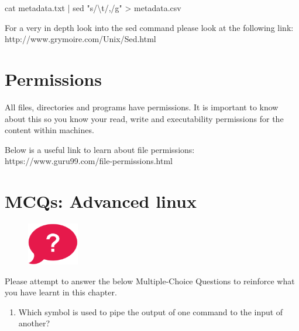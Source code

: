\documentclass[
  letterpaper,
  DIV=11,
  numbers=noendperiod]{scrreprt}
\newenvironment{Shaded}{\begin{snugshade}}{\end{snugshade}}
\newcommand{\FunctionTok}[1]{\textcolor[rgb]{0.28,0.35,0.67}{#1}}
\newcommand{\KeywordTok}[1]{\textcolor[rgb]{0.00,0.23,0.31}{#1}}
\newcommand{\NormalTok}[1]{\textcolor[rgb]{0.00,0.23,0.31}{#1}}
\newcommand{\OperatorTok}[1]{\textcolor[rgb]{0.37,0.37,0.37}{#1}}
\newcommand{\StringTok}[1]{\textcolor[rgb]{0.13,0.47,0.30}{#1}}
\providecommand{\tightlist}{%
  \setlength{\itemsep}{0pt}\setlength{\parskip}{0pt}}\usepackage{longtable,booktabs,array}
\begin{document}
\begin{Shaded}
\begin{Highlighting}[]
\FunctionTok{cat}\NormalTok{ metadata.txt }\KeywordTok{|} \FunctionTok{sed} \StringTok{"s/\textbackslash{}t/,/g"} \OperatorTok{\textgreater{}}\NormalTok{ metadata.csv}
\end{Highlighting}
\end{Shaded}

For a very in depth look into the sed command please look at the
following link: http://www.grymoire.com/Unix/Sed.html

\hypertarget{permissions}{%
\section{Permissions}\label{permissions}}

All files, directories and programs have permissions. It is important to
know about this so you know your read, write and executability
permissions for the content within machines.

Below is a useful link to learn about file permissions:\\
https://www.guru99.com/file-permissions.html

\hypertarget{mcqs-advanced-linux}{%
\section{MCQs: Advanced linux}\label{mcqs-advanced-linux}}

\begin{figure}

{\centering \includegraphics[width=0.2\textwidth,height=\textheight]{figures/question_bubble_red.png}

}

\end{figure}

Please attempt to answer the below Multiple-Choice Questions to
reinforce what you have learnt in this chapter.

\begin{enumerate}
\def\labelenumi{\arabic{enumi}.}
\tightlist
\item
  Which symbol is used to pipe the output of one command to the input of
  another?
\end{enumerate}
\end{document}
